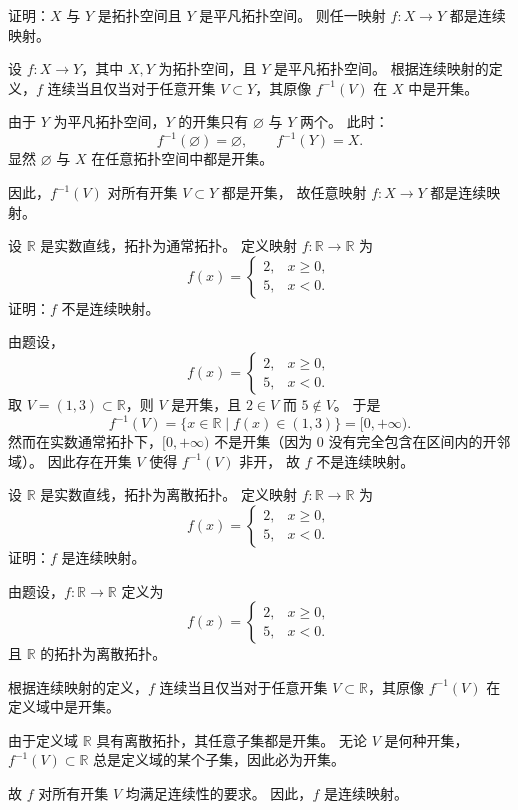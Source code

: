 \begin{homework}[2]
证明：\(X\) 与 \(Y\) 是拓扑空间且 \(Y\) 是平凡拓扑空间。  
则任一映射 \(f:X\to Y\) 都是连续映射。
\end{homework}
\begin{solution}
设 $f: X \to Y$，其中 $X, Y$ 为拓扑空间，且 $Y$ 是平凡拓扑空间。  
根据连续映射的定义，$f$ 连续当且仅当对于任意开集 $V \subset Y$，其原像 $f^{-1}(V)$ 在 $X$ 中是开集。  

由于 $Y$ 为平凡拓扑空间，$Y$ 的开集只有 $\varnothing$ 与 $Y$ 两个。  
此时：
\[
f^{-1}(\varnothing)=\varnothing,\qquad f^{-1}(Y)=X.
\]
显然 $\varnothing$ 与 $X$ 在任意拓扑空间中都是开集。  

因此，$f^{-1}(V)$ 对所有开集 $V\subset Y$ 都是开集，  
故任意映射 $f: X \to Y$ 都是连续映射。
\end{solution}
\begin{homework}[5]
设 \(\mathbb{R}\) 是实数直线，拓扑为通常拓扑。  
定义映射 \(f:\mathbb{R}\to\mathbb{R}\) 为
\[
f(x)=
\begin{cases}
2, & x\ge0,\\
5, & x<0.
\end{cases}
\]
证明：\(f\) 不是连续映射。
\end{homework}
\begin{solution}
由题设，
\[
f(x)=
\begin{cases}
2, & x \ge 0,\\
5, & x < 0.
\end{cases}
\]
取 $V=(1,3)\subset \mathbb{R}$，则 $V$ 是开集，且 $2\in V$ 而 $5\notin V$。  
于是
\[
f^{-1}(V)=\{x\in\mathbb{R}\mid f(x)\in(1,3)\}=[0,+\infty).
\]
然而在实数通常拓扑下，$[0,+\infty)$ 不是开集（因为 $0$ 没有完全包含在区间内的开邻域）。  
因此存在开集 $V$ 使得 $f^{-1}(V)$ 非开，  
故 $f$ 不是连续映射。
\end{solution}
\begin{homework}[6]
设 \(\mathbb{R}\) 是实数直线，拓扑为离散拓扑。  
定义映射 \(f:\mathbb{R}\to\mathbb{R}\) 为
\[
f(x)=
\begin{cases}
2, & x\ge0,\\
5, & x<0.
\end{cases}
\]
证明：\(f\) 是连续映射。
\end{homework}
\begin{solution}
由题设，$f:\mathbb{R}\to\mathbb{R}$ 定义为
\[
f(x)=
\begin{cases}
2, & x \ge 0,\\
5, & x < 0.
\end{cases}
\]
且 $\mathbb{R}$ 的拓扑为离散拓扑。

根据连续映射的定义，$f$ 连续当且仅当对于任意开集 $V \subset \mathbb{R}$，其原像 $f^{-1}(V)$ 在定义域中是开集。

由于定义域 $\mathbb{R}$ 具有离散拓扑，其任意子集都是开集。  
无论 $V$ 是何种开集，$f^{-1}(V) \subset \mathbb{R}$ 总是定义域的某个子集，因此必为开集。

故 $f$ 对所有开集 $V$ 均满足连续性的要求。  
因此，$f$ 是连续映射。
\end{solution}
